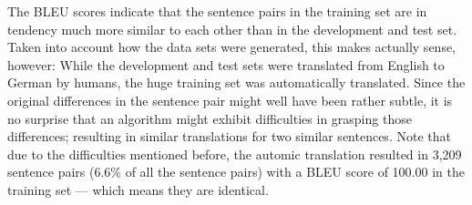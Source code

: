 















The BLEU scores indicate that the sentence pairs in the training set are in tendency much
more similar to each other than in the development and test set. Taken into account how
the data sets were generated, this makes actually sense, however: While the development
and test sets were translated from English to German by humans, the huge training set was
automatically translated. Since the original differences in the sentence pair might well
have been rather subtle, it is no surprise that an algorithm might exhibit difficulties in
grasping those differences; resulting in similar translations for two similar sentences.
Note that due to the difficulties mentioned before, the automic translation resulted in
3,209 sentence pairs (6.6\% of all the sentence pairs) with a BLEU score of 100.00 in the
training set --- which means they are identical.


